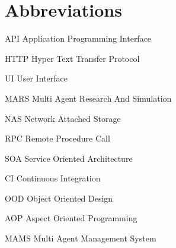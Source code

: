     \newcommand{\abbrlabel}[1]{\makebox[3cm][l]{\textbf{#1}\ }}
\newenvironment{abbreviations}{\begin{list}{}{\renewcommand{\makelabel}{\abbrlabel}}}{\end{list}}
%

\newpage
\section*{Abbreviations}
\begin{abbreviations}
\item[API] Application Programming Interface
\item[HTTP] Hyper Text Transfer Protocol
\item[UI] User Interface
\item[MARS] Multi Agent Research And Simulation
\item[NAS] Network Attached Storage
\item[RPC] Remote Procedure Call
\item[SOA] Service Oriented Architecture
\item[CI] Continuous Integration
\item[OOD] Object Oriented Design
\item[AOP] Aspect Oriented Programming
\item[MAMS] Multi Agent Management System
\end{abbreviations}
%